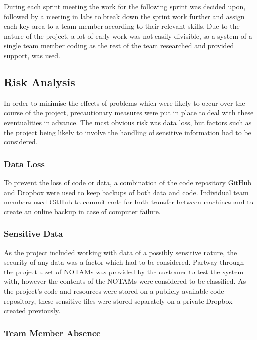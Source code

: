 \documentclass[a4paper, 12pt, twoside]{article}
\begin{document}
During each sprint meeting the work for the following sprint was decided upon, followed by a meeting in labs to break down the sprint work further and assign each key area to a team member according to their relevant skills. Due to the nature of the project, a lot of early work was not easily divisible, so a system of a single team member coding as the rest of the team researched and provided support, was used.

\subsection{Risk Analysis}
\label{sec:plan_risk_analysis}

In order to minimise the effects of problems which were likely to occur over the course of the project, precautionary measures were put in place to deal with these eventualities in advance. The most obvious risk was data loss, but factors such as the project being likely to involve the handling of sensitive information had to be considered.

\subsubsection{Data Loss}

To prevent the loss of code or data, a combination of the code repository GitHub and Dropbox were used to keep backups of both data and code. Individual team members used GitHub to commit code for both transfer between machines and to create an online backup in case of computer failure.

\subsubsection{Sensitive Data}

As the project included working with data of a possibly sensitive nature, the security of any data was a factor which had to be considered. Partway through the project a set of NOTAMs was provided by the customer to test the system with, however the contents of the NOTAMs were considered to be classified. As the project's code and resources were stored on a publicly available code repository, these sensitive files were stored separately on a private Dropbox created previously.

\subsubsection{Team Member Absence}
\end{document}
